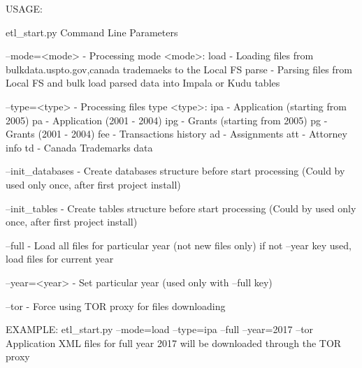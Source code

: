 USAGE\+: \begin{DoxyVerb}etl_start.py Command Line Parameters

--mode=<mode> - Processing mode
   <mode>:
          load  - Loading files from bulkdata.uspto.gov,canada trademaeks to the Local FS
          parse - Parsing files from Local FS and bulk load parsed data into Impala or Kudu tables

--type=<type> - Processing files type
   <type>:
          ipa - Application (starting from 2005)
          pa  - Application (2001 - 2004)
          ipg - Grants (starting from 2005)
          pg  - Grants (2001 - 2004)
          fee - Transactions history
          ad  - Assignments
          att - Attorney info
          td  - Canada Trademarks data

--init_databases - Create databases structure before start processing (Could by used only once, after first project install)

--init_tables - Create tables structure before start processing (Could by used only once, after first project install)

--full - Load all files for particular year (not new files only) if not --year key used, load files for current year

--year=<year> - Set particular year (used only with --full key)

--tor - Force using TOR proxy for files downloading

EXAMPLE: etl_start.py --mode=load --type=ipa --full --year=2017 --tor
         Application XML files for full year 2017 will be downloaded through the TOR proxy
\end{DoxyVerb}
 